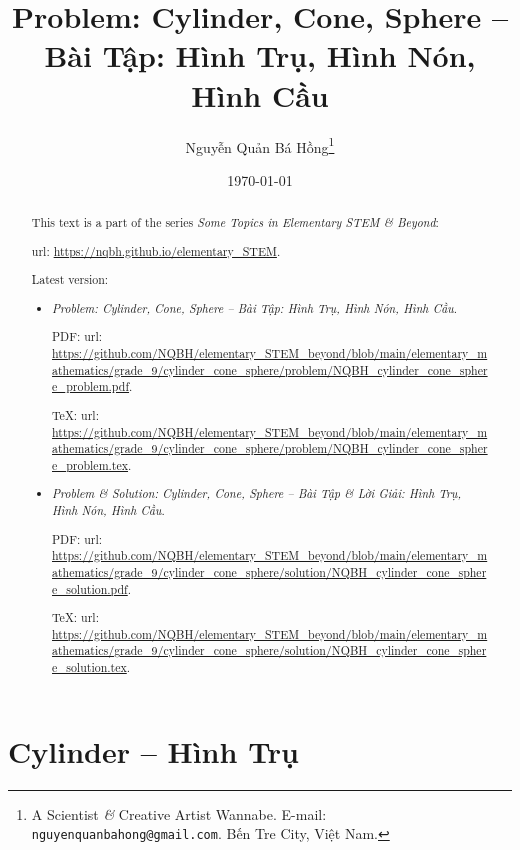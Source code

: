 \documentclass{article}
\title{Problem: Cylinder, Cone, Sphere -- Bài Tập: Hình Trụ, Hình Nón, Hình Cầu}
\author{Nguyễn Quản Bá Hồng\footnote{A Scientist {\it\&} Creative Artist Wannabe. E-mail: {\tt nguyenquanbahong@gmail.com}. Bến Tre City, Việt Nam.}}
\date{\today}
\begin{document}
\maketitle
\begin{abstract}
	This text is a part of the series {\it Some Topics in Elementary STEM \& Beyond}:
	
	{\sc url}: \url{https://nqbh.github.io/elementary_STEM}.
	
	Latest version:
	\begin{itemize}
		\item {\it Problem: Cylinder, Cone, Sphere -- Bài Tập: Hình Trụ, Hình Nón, Hình Cầu}.
		
		PDF: {\sc url}: \url{https://github.com/NQBH/elementary_STEM_beyond/blob/main/elementary_mathematics/grade_9/cylinder_cone_sphere/problem/NQBH_cylinder_cone_sphere_problem.pdf}.
		
		\TeX: {\sc url}: \url{https://github.com/NQBH/elementary_STEM_beyond/blob/main/elementary_mathematics/grade_9/cylinder_cone_sphere/problem/NQBH_cylinder_cone_sphere_problem.tex}.
		\item {\it Problem \& Solution: Cylinder, Cone, Sphere -- Bài Tập \& Lời Giải: Hình Trụ, Hình Nón, Hình Cầu}.
		
		PDF: {\sc url}: \url{https://github.com/NQBH/elementary_STEM_beyond/blob/main/elementary_mathematics/grade_9/cylinder_cone_sphere/solution/NQBH_cylinder_cone_sphere_solution.pdf}.
		
		\TeX: {\sc url}: \url{https://github.com/NQBH/elementary_STEM_beyond/blob/main/elementary_mathematics/grade_9/cylinder_cone_sphere/solution/NQBH_cylinder_cone_sphere_solution.tex}.
	\end{itemize}
\end{abstract}
\tableofcontents


\section{Cylinder -- Hình Trụ}
\end{document}

